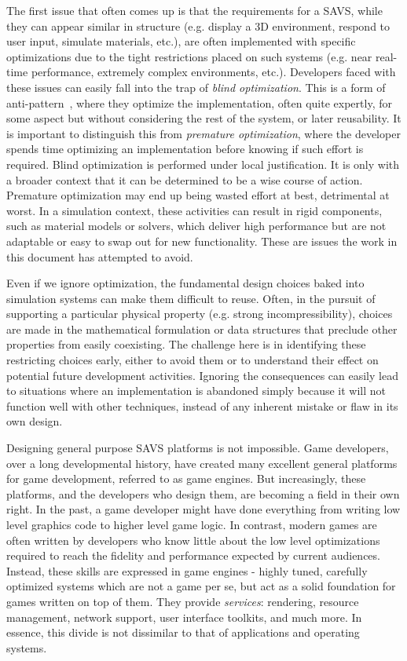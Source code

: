 The first issue that often comes up is that the
requirements for a SAVS, while they can appear similar in structure
(e.g. display a 3D environment, respond to user input, simulate
materials, etc.), are often implemented with specific optimizations
due to the tight restrictions placed on such systems (e.g. near
real-time performance, extremely complex environments,
etc.). Developers faced with these issues can easily fall into the
trap of \textit{blind optimization}. This is a form of anti-pattern~\citep{antipatterns:1998}, where they optimize the implementation,
often quite expertly, for some aspect but without considering the rest
of the system, or later reusability. It is important to distinguish
this from \textit{premature optimization}, where the developer spends
time optimizing an implementation before knowing if such effort is
required. Blind optimization is performed under local
justification. It is only with a broader context that it can be
determined to be a wise course of action. Premature optimization may
end up being wasted effort at best, detrimental at worst. In a
simulation context, these activities can result in rigid components,
such as material models or solvers, which deliver high performance but
are not adaptable or easy to swap out for new functionality. These are
issues the work in this document has attempted to avoid. 

Even if we ignore optimization, the fundamental design choices baked
into simulation systems can make them difficult to reuse. Often, in
the pursuit of supporting a particular physical property (e.g. strong
incompressibility), choices are made in the mathematical formulation or
data structures that preclude other properties from easily
coexisting. The challenge here is in identifying these restricting
choices early, either to avoid them or to understand their effect on
potential future development activities. Ignoring the consequences can
easily lead to situations where an implementation is abandoned simply
because it will not function well with other techniques, instead of 
any inherent mistake or flaw in its own design.

Designing general purpose SAVS platforms is not impossible. Game
developers, over a long developmental history, have created many
excellent general platforms for game development, referred to as game
engines. But increasingly, these platforms, and the developers who
design them, are becoming a field in their own right.  In the past, a
game developer might have done everything from writing low level
graphics code to higher level game logic. In contrast, modern games
are often written by developers who know little about the low level
optimizations required to reach the fidelity and performance expected
by current audiences. Instead, these skills are expressed in game
engines - highly tuned, carefully optimized systems which are not a
game per se, but act as a solid foundation for games written on top of
them. They provide \textit{services}: rendering, resource management,
network support, user interface toolkits, and much more. In essence,
this divide is not dissimilar to that of applications and operating
systems.

